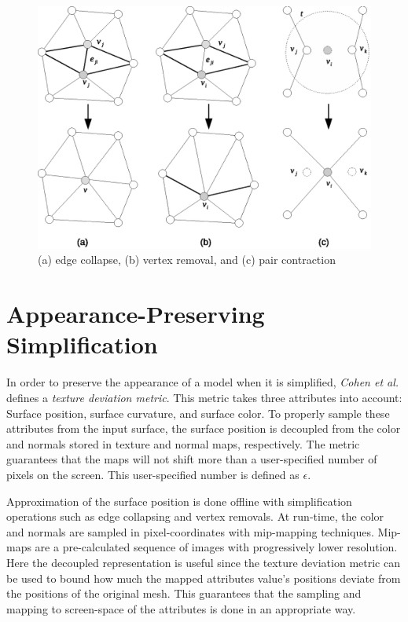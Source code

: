 \begin{figure}[h]
    \centering
    \includegraphics[width=\textwidth]{figures/mesh_transformations.eps}
    \caption{(a) edge collapse, (b) vertex removal, and (c) pair contraction}
    \label{fig:mesh_transformations}
\end{figure}
\fi %


\section{Appearance-Preserving Simplification} \label{sec:appearance-preserving_simplification}
In order to preserve the appearance of a model when it is simplified, \emph{Cohen et al.} \cite{cohen1998appearance} defines a \emph{texture deviation metric}. This metric takes three attributes into account: Surface position, surface curvature, and surface color. To properly sample these attributes from the input surface, the surface position is decoupled from the color and normals stored in texture and normal maps, respectively. The metric guarantees that the maps will not shift more than a user-specified number of pixels on the screen. This user-specified number is defined as $\epsilon$.

Approximation of the surface position is done offline with simplification operations such as edge collapsing and vertex removals. At run-time, the color and normals are sampled in pixel-coordinates with mip-mapping techniques. Mip-maps are a pre-calculated sequence of images with progressively lower resolution. Here the decoupled representation is useful since the texture deviation metric can be used to bound how much the mapped attributes value's positions deviate from the positions of the original mesh. This guarantees that the sampling and mapping to screen-space of the attributes is done in an appropriate way.

